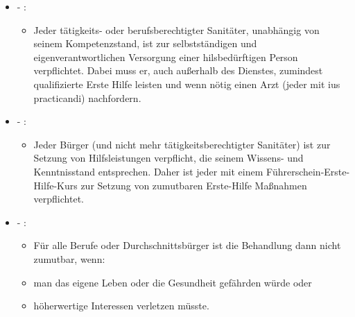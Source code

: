 \begin{itemize}
	\item {\mdseries
	 -
	:}

	\begin{itemize}

		\item {\mdseries
		Jeder tätigkeits- oder berufsberechtigter Sanitäter, unabhängig
		von seinem Kompetenzstand, ist zur selbstständigen und
		eigenverantwortlichen Versorgung einer hilsbed\"urftigen Person
		verpflichtet. Dabei muss er, auch au{\ss}erhalb des Dienstes, zumindest
		qualifizierte Erste Hilfe leisten und wenn n\"otig einen Arzt (jeder
		mit ius practicandi) nachfordern.}

	\end{itemize}

	\item {\mdseries
	 - :}

	\begin{itemize}
	
		\item {\mdseries
		Jeder B\"urger (und nicht mehr tätigkeitsberechtigter Sanitäter) ist
		zur Setzung von Hilfsleistungen verpflicht, die seinem Wissens- und
		Kenntnisstand entsprechen. Daher ist jeder mit einem
		F\"uhrerschein-Erste-Hilfe-Kurs zur Setzung von zumutbaren Erste-Hilfe
		Ma{\ss}nahmen verpflichtet.}
		
	\end{itemize}

	\item {\mdseries
	 -
	:}

	\begin{itemize}
	
		\item {\mdseries
		F\"ur alle Berufe oder Durchschnittsb\"urger ist die Behandlung dann
		nicht zumutbar, wenn:}
	
	\end{itemize}

	\begin{itemize}
		\item {\mdseries
		man das eigene Leben oder die Gesundheit gefährden w\"urde oder}

		\item {\mdseries
		h\"oherwertige Interessen verletzen m\"usste.}

	\end{itemize}

\end{itemize}

